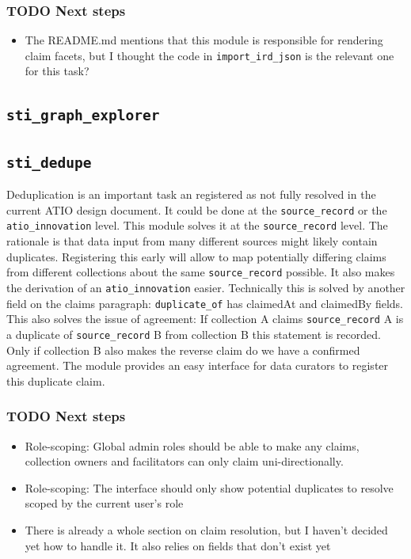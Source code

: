 \documentclass{scrartcl}
\begin{document}
\subsubsection{{\bfseries\sffamily TODO} Next steps}
\label{sec:org37308ff}
\begin{itemize}
\item The README.md mentions that this module is responsible for rendering claim facets, but I thought the code in \texttt{import\_ird\_json} is the relevant one for this task?
\end{itemize}
\subsection{\texttt{sti\_graph\_explorer}}
\label{sec:org5db4cb1}
\subsection{\texttt{sti\_dedupe}}
\label{sec:org193394f}
Deduplication is an important task an registered as not fully resolved in the current ATIO design document. It could be done at the \texttt{source\_record} or the \texttt{atio\_innovation} level. This module solves it at the \texttt{source\_record} level. The rationale is that data input from many different sources might likely contain duplicates. Registering this early will allow to map potentially differing claims from different collections about the same \texttt{source\_record} possible. It also makes the derivation of an \texttt{atio\_innovation} easier. Technically this is solved by another field on the claims paragraph: \texttt{duplicate\_of} has claimedAt and claimedBy fields. This also solves the issue of agreement: If collection A claims \texttt{source\_record} A is a duplicate of \texttt{source\_record} B from collection B this statement is recorded. Only if collection B also makes the reverse claim do we have a confirmed agreement.
The module provides an easy interface for data curators to register this duplicate claim.
\subsubsection{{\bfseries\sffamily TODO} Next steps}
\label{sec:orgdad8fef}
\begin{itemize}
\item Role-scoping: Global admin roles should be able to make any claims, collection owners and facilitators can only claim uni-directionally.
\item Role-scoping: The interface should only show potential duplicates to resolve scoped by the current user's role
\item There is already a whole section on claim resolution, but I haven't decided yet how to handle it. It also relies on fields that don't exist yet
\end{itemize}
\end{document}
